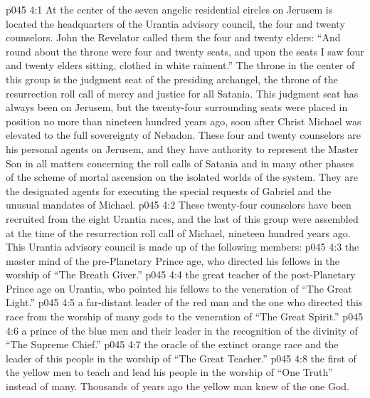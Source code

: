 \vs p045 4:1 At the center of the seven angelic residential circles on Jerusem is located the headquarters of the Urantia advisory council, the four and twenty counselors. John the Revelator called them the four and twenty elders: “And round about the throne were four and twenty seats, and upon the seats I saw four and twenty elders sitting, clothed in white raiment.” The throne in the center of this group is the judgment seat of the presiding archangel, the throne of the resurrection roll call of mercy and justice for all Satania. This judgment seat has always been on Jerusem, but the twenty\hyp{}four surrounding seats were placed in position no more than nineteen hundred years ago, soon after Christ Michael was elevated to the full sovereignty of Nebadon. These four and twenty counselors are his personal agents on Jerusem, and they have authority to represent the Master Son in all matters concerning the roll calls of Satania and in many other phases of the scheme of mortal ascension on the isolated worlds of the system. They are the designated agents for executing the special requests of Gabriel and the unusual mandates of Michael.
\vs p045 4:2 These twenty\hyp{}four counselors have been recruited from the eight Urantia races, and the last of this group were assembled at the time of the resurrection roll call of Michael, nineteen hundred years ago. This Urantia advisory council is made up of the following members:
\vs p045 4:3 \bibnobreakspace {} the master mind of the pre\hyp{}Planetary Prince age, who directed his fellows in the worship of “The Breath Giver.”
\vs p045 4:4 \pc {}\bibnobreakspace {} the great teacher of the post\hyp{}Planetary Prince age on Urantia, who pointed his fellows to the veneration of “The Great Light.”
\vs p045 4:5 \pc {}\bibnobreakspace {} a far\hyp{}distant leader of the red man and the one who directed this race from the worship of many gods to the veneration of “The Great Spirit.”
\vs p045 4:6 \pc {}\bibnobreakspace {} a prince of the blue men and their leader in the recognition of the divinity of “The Supreme Chief.”
\vs p045 4:7 \pc {}\bibnobreakspace {} the oracle of the extinct orange race and the leader of this people in the worship of “The Great Teacher.”
\vs p045 4:8 \pc {}\bibnobreakspace {} the first of the yellow men to teach and lead his people in the worship of “One Truth” instead of many. Thousands of years ago the yellow man knew of the one God.
